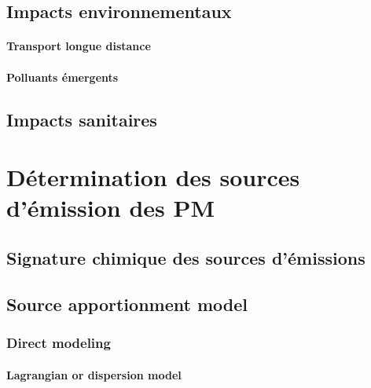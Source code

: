 \subsection{Impacts environnementaux}%
\label{sub:impacts_environnementaux}

\paragraph{Transport longue distance}%
\label{par:transport_longue_distance}


\paragraph{Polluants émergents}%
\label{par:polluants_emergents}



\subsection{Impacts sanitaires}%
\label{sub:impacts_sanitaires}



\section{Détermination des sources d'émission des PM}%
\label{sec:source_apportionment_of_pm}

\subsection{Signature chimique des sources d'émissions}%
\label{sec:chemical_signature_of_the_sources}

\subsection{Source apportionment model}%
\label{sec:source_apportionment_model}

\subsubsection{Direct modeling}%
\label{sub:direct_modeling}

\paragraph{Lagrangian or dispersion model}%
\label{sub:lagrangian_or_dispersion_model}

